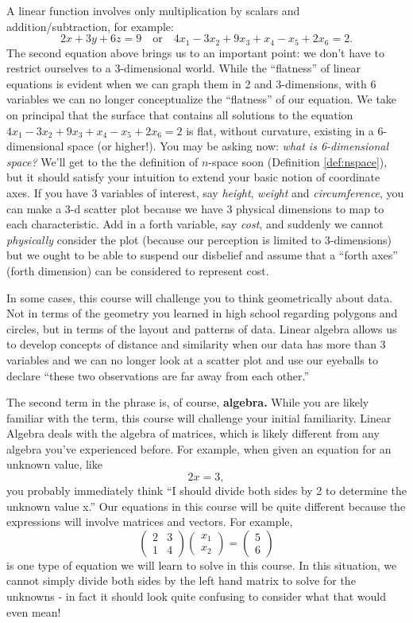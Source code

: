\documentclass[
]{article}
\theoremstyle{definition}
\theoremstyle{definition}
\theoremstyle{definition}
\theoremstyle{definition}
\theoremstyle{remark}
\begin{document}
A linear function involves only multiplication by scalars and addition/subtraction, for example:
\[2x+3y+6z=9 \quad \mbox{or} \quad 4x_1-3x_2+9x_3+x_4-x_5+2x_6 = 2.\]
The second equation above brings us to an important point: we don't have to restrict ourselves to a 3-dimensional world. While the ``flatness'' of linear equations is evident when we can graph them in 2 and 3-dimensions, with 6 variables we can no longer conceptualize the ``flatness'' of our equation. We take on principal that the surface that contains all solutions to the equation \(4x_1-3x_2+9x_3+x_4-x_5+2x_6 = 2\) is flat, without curvature, existing in a 6-dimensional space (or higher!). You may be asking now: \emph{what is 6-dimensional space?} We'll get to the the definition of \(n\)-space soon (Definition \ref{def:nspace}), but it should satisfy your intuition to extend your basic notion of coordinate axes. If you have 3 variables of interest, say \emph{height}, \emph{weight} and \emph{circumference}, you can make a 3-d scatter plot because we have 3 physical dimensions to map to each characteristic. Add in a forth variable, say \emph{cost}, and suddenly we cannot \emph{physically} consider the plot (because our perception is limited to 3-dimensions) but we ought to be able to suspend our disbelief and assume that a ``forth axes'' (forth dimension) can be considered to represent cost.

In some cases, this course will challenge you to think geometrically about data. Not in terms of the geometry you learned in high school regarding polygons and circles, but in terms of the layout and patterns of data. Linear algebra allows us to develop concepts of distance and similarity when our data has more than 3 variables and we can no longer look at a scatter plot and use our eyeballs to declare ``these two observations are far away from each other.''

The second term in the phrase is, of course, \textbf{algebra.} While you are likely familiar with the term, this course will challenge your initial familiarity. Linear Algebra deals with the algebra of matrices, which is likely different from any algebra you've experienced before. For example, when given an equation for an unknown value, like
\[2x=3,\] you probably immediately think ``I should divide both sides by 2 to determine the unknown value x.'' Our equations in this course will be quite different because the expressions will involve matrices and vectors. For example,
\[\left(\begin{matrix} 2 & 3\\1&4 \end{matrix}\right) \left(\begin{matrix} x_1\\x_2 \end{matrix}\right) = \left(\begin{matrix} 5\\6 \end{matrix}\right)\]
is one type of equation we will learn to solve in this course. In this situation, we cannot simply divide both sides by the left hand matrix to solve for the unknowns - in fact it should look quite confusing to consider what that would even mean!
\end{document}
